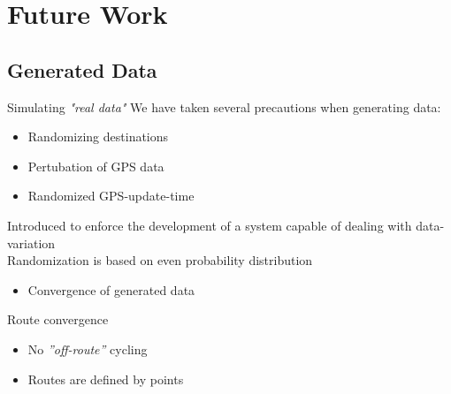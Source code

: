 \section{Future Work}

\subsection{Generated Data}
\begin{frame}{Simulating \textit{"real data"}}
We have taken several precautions when generating data:
\begin{itemize}
\item Randomizing destinations
\item Pertubation of GPS data
\item Randomized GPS-update-time
\end{itemize}
Introduced to enforce the development of a system capable of dealing with data-variation\\
Randomization is based on even probability distribution
\begin{itemize}
\item Convergence of generated data
\end{itemize}
\end{frame}

\begin{frame}{Route convergence}
\begin{center}
\end{center}
\begin{itemize}
\item No \textit{''off-route''} cycling
\item Routes are defined by points
\end{itemize}
\end{frame}

